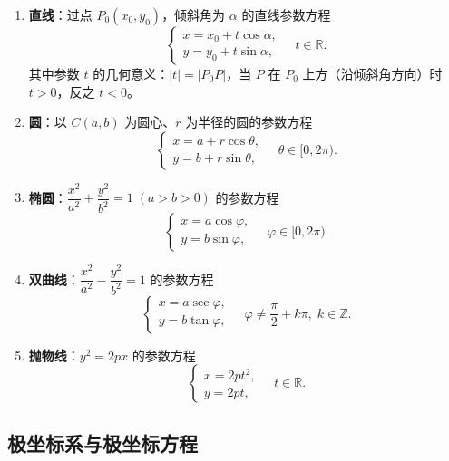 \documentclass[12pt,a4paper]{ctexart}
\theoremstyle{definition}
\begin{document}
\begin{knowledge}
  \begin{enumerate}[leftmargin=2em]
    \item \textbf{直线}：过点 $P_0(x_0,y_0)$，倾斜角为 $\alpha$ 的直线参数方程
    \[
      \begin{cases}
        x = x_0 + t\cos\alpha, \\[3pt]
        y = y_0 + t\sin\alpha,
      \end{cases}
      \quad t \in \mathbb{R}.
    \]
    其中参数 $t$ 的几何意义：$|t|=|P_0P|$，当 $P$ 在 $P_0$ 上方（沿倾斜角方向）时 $t>0$，反之 $t<0$。

    \item \textbf{圆}：以 $C(a,b)$ 为圆心、$r$ 为半径的圆的参数方程
    \[
      \begin{cases}
        x = a + r\cos\theta, \\[3pt]
        y = b + r\sin\theta,
      \end{cases}
      \quad \theta \in [0,2\pi).
    \]

    \item \textbf{椭圆}：$\dfrac{x^2}{a^2}+\dfrac{y^2}{b^2}=1\;(a>b>0)$ 的参数方程
    \[
      \begin{cases}
        x = a\cos\varphi, \\[3pt]
        y = b\sin\varphi,
      \end{cases}
      \quad \varphi \in [0,2\pi).
    \]

    \item \textbf{双曲线}：$\dfrac{x^2}{a^2}-\dfrac{y^2}{b^2}=1$ 的参数方程
    \[
      \begin{cases}
        x = a\sec\varphi, \\[3pt]
        y = b\tan\varphi,
      \end{cases}
      \quad \varphi \neq \dfrac{\pi}{2}+k\pi,\;k\in\mathbb{Z}.
    \]

    \item \textbf{抛物线}：$y^2=2px$ 的参数方程
    \[
      \begin{cases}
        x = 2pt^2, \\[3pt]
        y = 2pt,
      \end{cases}
      \quad t \in \mathbb{R}.
    \]
  \end{enumerate}
\end{knowledge}

\subsection{极坐标系与极坐标方程}
\end{document}
